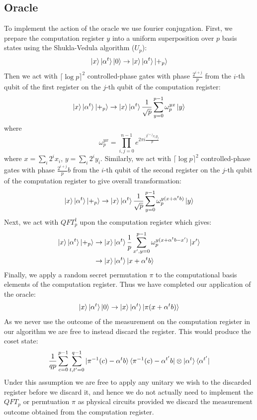 \documentclass[aps,floatfix,10pt,amssymb,amsfont,amsmath,superscriptaddress,float,nofootinbib,longbibliography,nobalancelastpage,twocolumn]{revtex4-2}
\begin{document}
\subsection{Oracle}
To implement the action of the oracle we use fourier conjugation. First, we prepare the computation register $y$ into a uniform superposition over $p$ basis states using the Shukla-Vedula algorithm ($U_p$):
\begin{equation}
   \ket{x}\ket{\alpha^t}\ket{0}\rightarrow\ket{x}\ket{\alpha^t}\ket{+_p}
\end{equation}
Then we act with $\lceil\log p\rceil^2$ controlled-phase gates with phase $\frac{2^{i+j}}{p}$ from the $i$-th qubit of the first register on the $j$-th qubit of the computation register:
\begin{equation}
    \ket{x}\ket{\alpha^t}\ket{+_p} \rightarrow \ket{x}\ket{\alpha^t}\frac{1}{\sqrt{p}}\sum_{y=0}^{p-1}\omega_p^{yx}\ket{y}
\end{equation}
where
\begin{equation}
    \omega_p^{yx} =  \prod_{i,j=0}^{n-1} e^{2\pi i \frac{2^{i+j}x_iy_j}{p}}
\end{equation}
where $x = \sum_i 2^i x_i$, $y = \sum_i 2^i y_i$. Similarly, we act with $\lceil\log p\rceil^2$ controlled-phase gates with phase $\frac{2^{i+j}}{p}b$ from the $i$-th qubit of the second register on the $j$-th qubit of the computation register to give overall transformation:
\begin{equation}
   \ket{x}\ket{\alpha^t}\ket{+_p}\rightarrow \ket{x}\ket{\alpha^t}\frac{1}{\sqrt{p}}\sum_{y=0}^{p-1}\omega_p^{y(x+\alpha^tb)}\ket{y}
\end{equation}
Next, we act with $QFT^{\dagger}_p$ upon the computation register which gives:
\begin{align}
    \ket{x}\ket{\alpha^t}\ket{+_p} &\rightarrow \ket{x}\ket{\alpha^t}\frac{1}{p}\sum_{x',y=0}^{p-1}\omega_p^{y(x+\alpha^t b-x')}\ket{x'}\\
    &\rightarrow \ket{x}\ket{\alpha^t}\ket{x+\alpha^tb}
\end{align}
Finally, we apply a random secret permutation $\pi$ to the computational basis elements of the computation register. Thus we have completed our application of the oracle:
\begin{equation}
   \ket{x}\ket{\alpha^t}\ket{0} \rightarrow \ket{x}\ket{\alpha^t}\ket{\pi(x+\alpha^tb)}
\end{equation}
As we never use the outcome of the measurement on the computation register in our algorithm we are free to instead discard the register. This would produce the coset state:
\begin{equation}
    \frac{1}{qp}\sum_{c=0}^{p-1}\sum_{t,t'=0}^{q-1} \ket{\pi^{-1}(c) - \alpha^tb}\bra{\pi^{-1}(c) - \alpha^{t'}b} \otimes \ket{\alpha^t}\bra{\alpha^{t'}}
\end{equation}
Under this assumption we are free to apply any unitary we wish to the discarded register before we discard it, and hence we do not actually need to implement the $QFT_p$ or permtuation $\pi$ as physical circuits provided we discard the measurement outcome obtained from the computation register.
\end{document}
